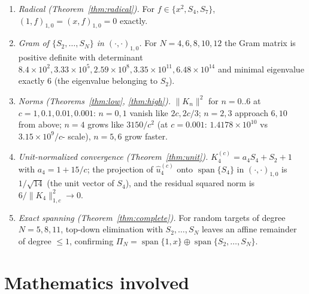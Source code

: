 ﻿\documentclass[11pt]{article}
\begin{document}
\begin{enumerate}[leftmargin=1.6em]
	\item \emph{Radical (Theorem~\ref{thm:radical}).}  For $f\in\{x^2,S_4,S_7\}$,
	$(1,f)_{1,0}=(x,f)_{1,0}=0$ exactly.
	\item \emph{Gram of $\{S_2,\ldots,S_N\}$ in $(\cdot,\cdot)_{1,0}$.}  For
	$N=4,6,8,10,12$ the Gram matrix is positive definite with determinant
	$8.4\times10^2, 3.33\times10^5, 2.59\times10^8, 3.35\times10^{11},
	6.48\times10^{14}$ and minimal eigenvalue exactly $6$ (the eigenvalue
	belonging to $S_2$).
	\item \emph{Norms (Theorems~\ref{thm:low}, \ref{thm:high}).}
	$\|K_n\|^2$ for $n=0..6$ at $c=1,0.1,0.01,0.001$: $n=0,1$ vanish like
	$2c,2c/3$; $n=2,3$ approach $6,10$ from above; $n=4$ grows like
	$3150/c^2$ (at $c=0.001$: $1.4178\times10^{10}$ vs $3.15\times10^9/c$-
	scale), $n=5,6$ grow faster.
	\item \emph{Unit-normalized convergence (Theorem~\ref{thm:unit}).}
	$K_4^{(c)}=a_4S_4+S_2+1$ with $a_4=1+15/c$; the projection of
	$\widehat u_4^{(c)}$ onto $\operatorname{span}\{S_4\}$ in
	$(\cdot,\cdot)_{1,0}$ is $1/\sqrt{14}$ (the unit vector of $S_4$), and
	the residual squared norm is $6/\|K_4\|_{1,c}^2\to0$.
	\item \emph{Exact spanning (Theorem~\ref{thm:complete}).}  For random
	targets of degree $N=5,8,11$, top-down elimination with
	$S_2,\ldots,S_N$ leaves an affine remainder of degree $\le1$, confirming
	$\Pi_N=\operatorname{span}\{1,x\}\oplus\operatorname{span}\{S_2,\ldots,S_N\}$.
\end{enumerate}

\section{Mathematics involved}
\end{document}
